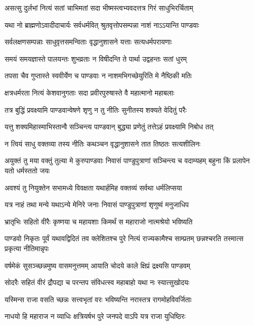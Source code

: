 \twolineshloka
{असत्सु दुर्लभां नित्यं सतां चाभिमतां सदा}
{भीष्मस्त्वभ्यवदत्तत्र गिरं साधुभिरर्चिताम्}


\twolineshloka
{यथा नो ब्राह्मणोऽवादीदाचार्यः सर्वधर्मवित्}
{श्रुतवृत्तोपसम्पन्ना नाशं नाऽऽयान्ति पाण्डवाः}


\twolineshloka
{सर्वलक्षणसम्पन्नाः साधुवृत्तसमन्विताः}
{वृद्धानुशासने यत्ताः सत्यधर्मपरायणाः}


\twolineshloka
{समयं समयज्ञास्ते पालयन्तः शुभव्रताः}
{न विषीदन्ति ते पार्था उद्वहन्तः सतां धुरम्}


\twolineshloka
{तपसा चैव गुप्तास्ते स्ववीर्येण च पाण्डवाः}
{न नाशमभिगच्छेयुरिति मे नैष्ठिकी मतिः}


\twolineshloka
{क्षत्रधर्मरता नित्यं केशवानुगताः सदा}
{प्रवीरपुरुषास्ते वै महात्मानो महाबलाः}


\twolineshloka
{तत्र बुद्धिं प्रवक्ष्यामि पाण्डवान्वेषणे शृणु}
{न तु नीतिः सुनीतस्य शक्यते वेदितुं परैः}


\twolineshloka
{यत्तु शक्यमिहास्माभिस्तान्वै सञ्चिन्त्य पाण्डवान्}
{बुद्ध्या प्रणेतुं तत्तेऽहं प्रवक्ष्यामि निबोध तत्}


\twolineshloka
{न त्वियं साधु वक्तव्या तस्य नीतिः कथञ्चन}
{वृद्धानुशासने तात तिष्ठतः सत्यशीलिनः}


\threelineshloka
{अयुक्तं तु मया वक्तुं तुल्या मे कुरुपाण्डवाः}
{निवासं पाण्डुपुत्राणां सञ्चिन्त्य च वदाम्यहम्}
{बहुना किं प्रलापेन यतो धर्मस्ततो जयः}


\twolineshloka
{अवश्यं तु नियुक्तेन सभामध्ये विवक्षता}
{यथार्हमिह वक्तव्यं सर्वथा धर्मलिप्सया}


\twolineshloka
{यत्र नाहं तथा मन्ये यथाऽन्ये मेनिरे जनाः}
{निवासं पाण्डुपुत्राणां शृणुष्वं मनुजाधिप}


\twolineshloka
{भ्रातृभिः सहितो वीरैः कृष्णया च महायशाः}
{किमर्थं स महाराजो नात्मश्रेयो भविष्यति}


\threelineshloka
{पाण्डवो निकृतः पूर्वं यथावद्विदितं तव}
{क्लेशितश्च पुरे नित्यं राज्यकामैश्च साम्प्रतम्}
{छन्नश्चरति तस्मात्स प्रकृत्या नीतिमान्नृपः}


\twolineshloka
{वर्षमेकं सुसञ्च्छन्नमुष्य वासमनुत्तमम्}
{आयाति चोदये काले क्षिप्रं द्रक्ष्यसि पाण्डवम्}


\twolineshloka
{सोदरैः सहितं वीरं द्रौपद्या च परन्तप}
{संविधत्स्व महाबाहो यथा नः स्यात्सुखोदयः}


\twolineshloka
{यस्मिन्स राजा वसति च्छन्नः सत्त्वभृतां वरः}
{भविष्यन्ति नरास्तत्र रागमोहविवर्जिताः}


\twolineshloka
{नाधयो हि महाराज न व्याधिः क्षत्रियर्षभ}
{पुरे जनपदे वाऽपि यत्र राजा युधिष्ठिरः}


